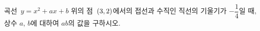 곡선~$y=x^2+ax+b$ 위의 점~$(3{,}\mkern3mu\mathopen{}2)$에서의 접선과 수직인 직선의 기울기가 $-\dfrac{1}{4}$일 때, 상수 $a$, $b$에 대하여 $ab$의 값을 구하시오.
